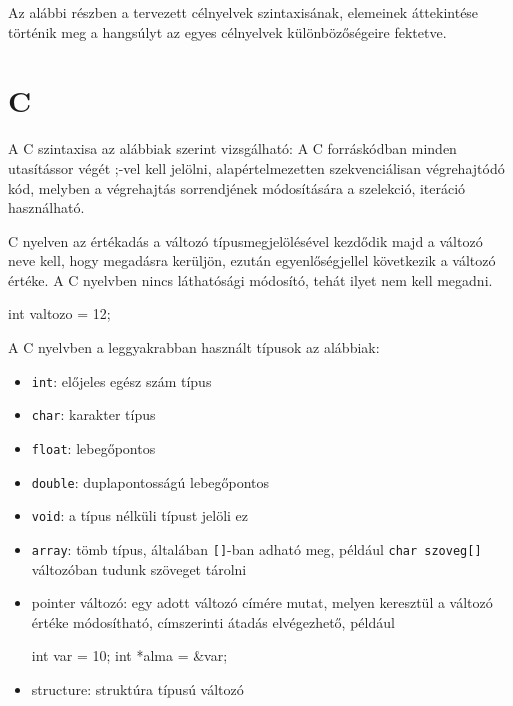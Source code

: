 
Az alábbi részben a tervezett célnyelvek szintaxisának, elemeinek áttekintése történik meg a hangsúlyt az egyes célnyelvek különbözőségeire fektetve.



\section{C}

A C szintaxisa az alábbiak szerint vizsgálható:
A C forráskódban minden utasítássor végét ;-vel kell jelölni, alapértelmezetten szekvenciálisan végrehajtódó kód, melyben a végrehajtás sorrendjének módosítására a szelekció, iteráció használható.

C nyelven az értékadás a változó típusmegjelölésével kezdődik majd a változó neve kell, hogy megadásra kerüljön, ezután egyenlőségjellel következik a változó értéke. A C nyelvben nincs láthatósági módosító, tehát ilyet nem kell megadni.

\begin{cpp}
int valtozo = 12;
\end{cpp}

A C nyelvben a leggyakrabban használt típusok az alábbiak:
\begin{itemize}
\item \texttt{int}: előjeles egész szám típus
\item \texttt{char}: karakter típus
\item \texttt{float}: lebegőpontos 
\item \texttt{double}: duplapontosságú lebegőpontos
\item \texttt{void}: a típus nélküli típust jelöli ez
\item \texttt{array}: tömb típus, általában \texttt{[]}-ban adható meg, például \texttt{char szoveg[]} változóban tudunk szöveget tárolni
\item pointer változó: egy adott változó címére mutat, melyen keresztül a változó értéke módosítható, címszerinti átadás elvégezhető, például
\begin{cpp}
int var = 10;
int *alma = &var;
\end{cpp}
\item structure: struktúra típusú változó
\end{itemize}

